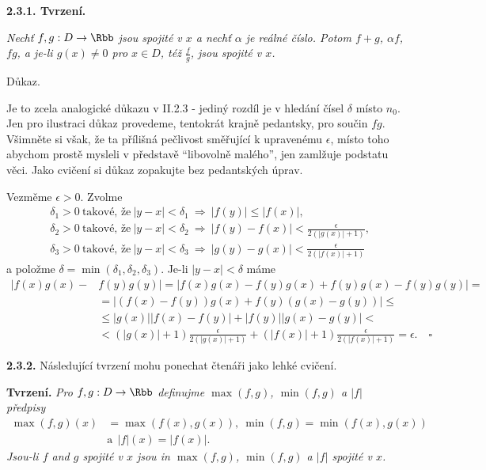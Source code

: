 \documentclass[12pt]{article}
\begin{document}
{ \medskip
 
 {\bf 2.3.1. Tvrzení.} {\em Nechť  $f,g:D\to\Rbb$ jsou spojité v $x$ a nechť
$\alpha$ je reálné číslo. Potom
 $f+g$, $\alpha f$, $fg$, a je-li  $g(x)\neq 0$ pro $x\in D$, též  $\frac{f}{g}$,
 jsou spojité v $x$.
 
 Důkaz.} Je to zcela analogické důkazu v II.2.3 - jediný rozdíl je v hledání čísel $\delta$ místo $n_0$. Jen pro ilustraci důkaz provedeme, tentokrát krajně pedantsky, pro součin $fg$. Všimněte si však, že ta přílišná pečlivost směřující k upravenému  $\epsilon$, místo toho abychom prostě mysleli v představě  ``libovolně malého'', jen zamlžuje podstatu věci. Jako cvičení si důkaz zopakujte bez pedantských úprav.

 \smallskip
 
 Vezměme $\epsilon>0$. Zvolme
 $$
 \begin{aligned}
 &\delta_1> 0 \ \text{takové, že}\  |y-x|<\delta_1 \ \Rightarrow\  
 |f(y)|\leq |f(x)|,\\
 &\delta_2> 0 \ \text{takové, že}\  |y-x|<\delta_2 \ \Rightarrow\  
 |f(y)-f(x)|< \frac{\epsilon}{2(|g(x)|+1)},\\
 &\delta_3> 0 \ \text{takové, že}\  |y-x|<\delta_3 \ \Rightarrow\  
 |g(y)-g(x)|< \frac{\epsilon}{2(|f(x)|+1)}
 \end{aligned}
 $$
a položme $\delta=\min(\delta_1,\delta_2,\delta_3)$. Je-li $|y-x|<\delta$ máme
 $$
 \begin{aligned}
 |f(x)g(x)-&f(y)g(y)|=|f(x)g(x)-f(y)g(x)+f(y)g(x)-f(y)g(y)|=\\
 &=|(f(x)-f(y))g(x)+f(y)(g(x)-g(y))|\leq \\
 &\leq|g(x)||f(x)-f(y)|+|f(y)||g(x)-g(y)|< \\
 &<(|g(x)|+1)\frac{\epsilon}{2(|g(x)|+1)} +
 (|f(x)|+1)\frac{\epsilon}{2(|f(x)|+1)}=\epsilon.\quad\square
 \end{aligned} 
 $$
 
 
 \medskip
 
 {\bf 2.3.2.} Následující tvrzení mohu ponechat čtenáři jako lehké cvičení.

\smallskip
 
 {\bf Tvrzení.} {\em Pro $f,g:D\to \Rbb$ definujme $\max(f,g)$, $\min(f,g)$ a
 $|f|$ předpisy
 $$
 \begin{aligned}
 \max(f,g)(x)&=\max(f(x),g(x)), \ \min(f,g)=\min(f(x),g(x)) \\ 
 &\text{a}\ \  
 |f|(x)=|f(x)|.
 \end{aligned}
 $$
Jsou-li $f$ and $g$ spojité v $x$ jsou in $\max(f,g)$, $\min(f,g)$ a 
 $|f|$ spojité v $x$.}
 
}
\end{document}
